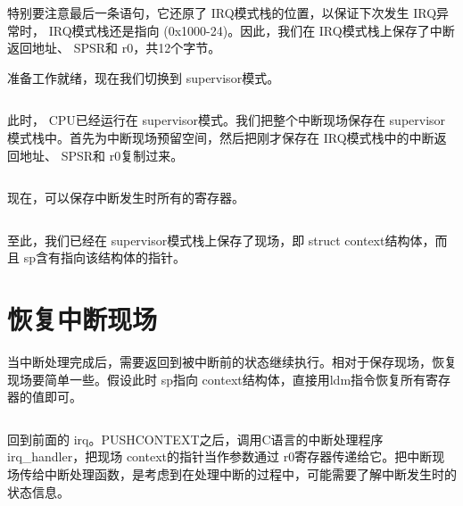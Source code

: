 \documentclass[main.tex]{subfiles}
\begin{document}
\begin{CJK*}{UTF8}{song}
特别要注意最后一条语句，它还原了 IRQ模式栈的位置，以保证下次发生 IRQ异常时， IRQ模式栈还是指向 (0x1000-24)。因此，我们在 IRQ模式栈上保存了中断返回地址、 SPSR和 r0，共12个字节。
\par
准备工作就绪，现在我们切换到 supervisor模式。

\begin{code}
\label{code:3-10}
\inputminted[firstline=49,lastline=52,linenos,numbersep=5pt,frame=lines,framesep=2mm]{gas}{src/chapter03/kernel/entry.S}
\end{code}

此时， CPU已经运行在 supervisor模式。我们把整个中断现场保存在 supervisor模式栈中。首先为中断现场预留空间，然后把刚才保存在 IRQ模式栈中的中断返回地址、 SPSR和 r0复制过来。

\begin{code}
\label{code:3-11}
\inputminted[firstline=53,lastline=59,linenos,numbersep=5pt,frame=lines,framesep=2mm]{gas}{src/chapter03/kernel/entry.S}
\end{code}

现在，可以保存中断发生时所有的寄存器。

\begin{code}
\label{code:3-12}
\inputminted[firstline=60,lastline=63,linenos,numbersep=5pt,frame=lines,framesep=2mm]{gas}{src/chapter03/kernel/entry.S}
\end{code}
至此，我们已经在 supervisor模式栈上保存了现场，即 struct context结构体，而且 sp含有指向该结构体的指针。

\section{恢复中断现场}
当中断处理完成后，需要返回到被中断前的状态继续执行。相对于保存现场，恢复现场要简单一些。假设此时 sp指向 context结构体，直接用ldm指令恢复所有寄存器的值即可。

\begin{code}
\label{code:3-13}
\inputminted[firstline=65,lastline=71,linenos,numbersep=5pt,frame=lines,framesep=2mm]{gas}{src/chapter03/kernel/entry.S}
\end{code}

回到前面的 irq。PUSH\-CONTEXT之后，调用C语言的中断处理程序 irq\_\-handler，把现场 context的指针当作参数通过 r0寄存器传递给它。把中断现场传给中断处理函数，是考虑到在处理中断的过程中，可能需要了解中断发生时的状态信息。


\end{CJK*}
\end{document}
